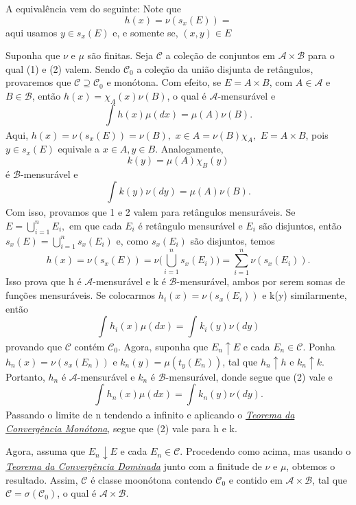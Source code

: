 \documentclass[MeasureTheory/measure_theory.tex]{subfiles}
\begin{document}
\begin{proof*}
	A equivalência vem do seguinte: Note que
	\[
		h(x) = \nu(s_x(E)) =
	\]
	aqui usamos \(y\in s_x(E)\) e, e somente se, \((x, y)\in E\)

	Suponha que \(\nu\) e \(\mu \) são finitas. Seja \(\mathcal{C}\) a coleção de conjuntos em \(\mathcal{A}\times \mathcal{B}\) para o qual (1)
	e (2) valem. Sendo \(\mathcal{C}_{0}\) a coleção da união disjunta de retângulos, provaremos que \(\mathcal{C}\supseteq \mathcal{C}_{0}\) e monótona.
	Com efeito, se \(E = A\times B\), com \(A\in \mathcal{A}\) e \(B\in \mathcal{B}\), então \(h(x) = \chi_{A}(x)\nu(B)\), o qual é \(\mathcal{A}\)-mensurável e
	\[
		\int_{}h(x) \mu (dx) = \mu (A)\nu(B).
	\]
	Aqui, \(h(x) = \nu(s_x(E)) = \nu(B),\) \(x\in A = \nu(B)\chi_{A},\) \(E = A\times B\), pois \(y\in s_x(E) \) equivale a \(x\in  A, y\in B\). Analogamente,
	\[
		k(y) = \mu (A)\chi_{B}(y)
	\]
	é \(\mathcal{B}\)-mensurável e
	\[
		\int_{}k(y)\nu( dy) = \mu (A)\nu(B).
	\]
	Com isso, provamos que 1 e 2 valem para retângulos mensuráveis. Se \(E = \bigcup_{i=1}^{n}E_{i},\) em que cada \(E_{i}\) é retângulo mensurável e \(E_{i}\) são disjuntos, então \(s_x(E) = \bigcup_{i=1}^{n}s_x(E_{i})\)
	e, como \(s_x(E_{i})\) são disjuntos, temos
	\[
		h(x) = \nu(s_x(E)) = \nu \biggl(\bigcup_{i=1}^{n}s_x(E_{i})\biggr) = \sum\limits_{i=1}^{n}\nu(s_x(E_{i})).
	\]
	Isso prova que h é \(\mathcal{A}\)-mensurável e k é \(\mathcal{B}\)-mensurável, ambos por serem somas de funções mensuráveis. Se colocarmos \(h_{i}(x) = \nu(s_x(E_{i}))\) e k(y) similarmente, então
	\[
		\int_{}h_{i}(x)\mu ( dx) = \int_{}k_{i}(y)\nu( dy)
	\]
	provando que \(\mathcal{C}\) contém \(\mathcal{C}_{0}\). Agora, suponha que \(E_{n}\uparrow E\) e cada \(E_{n}\in \mathcal{C}\). Ponha \(h_{n}(x) = \nu(s_x(E_{n}))\) e \(k_{n}(y) = \mu (t_y(E_{n}))\), tal que
	\(h_{n}\uparrow h\) e \(k_{n}\uparrow k\). Portanto, \(h_{n}\) é \(\mathcal{A}\)-mensurável e \(k_{n}\) é \(\mathcal{B}\)-mensurável, donde segue que (2) vale e
	\[
		\int_{}h_{n}(x)\mu ( dx) = \int_{}k_{n}(y)\nu( dy).
	\]
	Passando o limite de n tendendo a infinito e aplicando o \hyperlink{monotone_convergence}{\textit{Teorema da Convergência Monótona}}, segue que (2) vale para h e k.

	Agora, assuma que \(E_{n}\downarrow E\) e cada \(E_{n}\in \mathcal{C}.\) Procedendo como acima, mas usando o \hyperlink{dominated_convergence}{\textit{Teorema da Convergência Dominada}} junto com a finitude de \(\nu\) e \(\mu \), obtemos o resultado.
	Assim, \(\mathcal{C}\) é classe moonótona contendo \(\mathcal{C}_{0}\) e contido em \(\mathcal{A}\times \mathcal{B}\), tal que \(\mathcal{C} = \sigma (\mathcal{C}_{0})\), o qual é \(\mathcal{A}\times \mathcal{B}.\)


\end{proof*}
\end{document}
